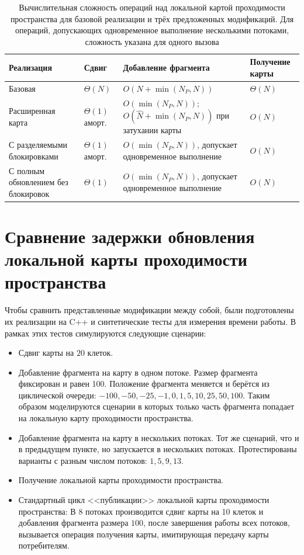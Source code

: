\begin{table}[htbp]
	\small
	\centering
	\begin{tabular}{|p{}|p{}|p{}|p{}|}
		\hline
		\textbf{Реализация} & \textbf{Сдвиг} & \textbf{Добавление фрагмента} & \textbf{Получение карты} \\
		\hline
		Базовая & $\Theta(N)$ & $O(N + \min(N_P,N))$ & $\Theta(N)$ \\
		\hline
		Расширенная карта & $\Theta(1)$\newline аморт. & $O(\min(N_P,N))$;\newline $O(\widehat{N} + \min(N_P,N))$ при затухании карты & $O(N)$ \\
		\hline
		С разделяемыми блокировками & $\Theta(1)$\newline аморт. & $O(\min(N_P,N))$, допускает одновременное выполнение & $O(N)$ \\
		\hline
		С полным обновлением без блокировок & $\Theta(1)$ & $O(\min(N_P,N))$, допускает одновременное выполнение & $O(N)$ \\
		\hline
	\end{tabular}
	\caption{Вычислительная сложность операций над локальной картой проходимости пространства для базовой реализации и трёх предложенных модификаций. Для операций, допускающих одновременное выполнение несколькими потоками, сложность указана для одного вызова}
	\label{tab:complexity_summary}
\end{table}

\section{Сравнение задержки обновления локальной карты проходимости пространства}\label{sec:experiments}

Чтобы сравнить представленные модификации между собой, были подготовлены их реализации на C++ и синтетические тесты для измерения времени работы. В рамках этих тестов симулируются следующие сценарии:

\begin{itemize}
	\item Сдвиг карты на $20$ клеток. 
	\item Добавление фрагмента на карту в одном потоке. Размер фрагмента фиксирован и равен 100. Положение фрагмента меняется и берётся из циклической очереди: $-100, -50, -25, -1, 0, 1, 5, 10, 25, 50, 100$. Таким образом моделируются сценарии в которых только часть фрагмента попадает на локальную карту проходимости пространства.
	\item Добавление фрагмента на карту в нескольких потоках. Тот же сценарий, что и в предыдущем пункте, но запускается в нескольких потоках. Протестированы варианты с разным числом потоков: $1, 5, 9, 13$. 
	\item Получение локальной карты проходимости пространства.
	\item Стандартный цикл <<публикации>> локальной карты проходимости пространства: В $8$ потоках производится сдвиг карты на 10 клеток и добавления фрагмента размера $100$, после завершения работы всех потоков, вызывается операция получения карты, имитирующая передачу карты потребителям.
\end{itemize}

